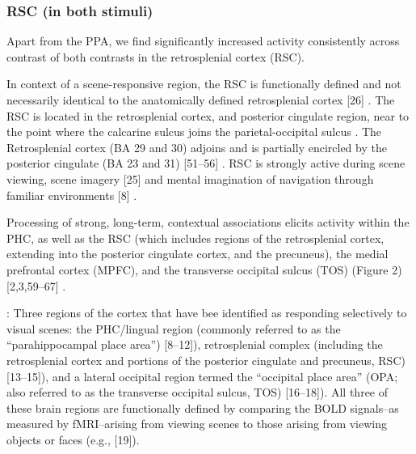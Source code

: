 \documentclass[english]{article}
\begin{document}
\subsubsection{RSC (in both stimuli)}



Apart from the PPA, we find significantly increased activity consistently across
contrast of both contrasts in the retrosplenial cortex (RSC).

In context of a scene-responsive region, the RSC is functionally defined and not
necessarily identical to the anatomically defined retrosplenial cortex [26]
\citep{epstein2008parahippocampal}.
The RSC is located in the retrosplenial cortex, and posterior cingulate region,
near to the point where the calcarine sulcus joins the parietal-occipital sulcus
\citep{epstein2008parahippocampal}.
The Retrosplenial cortex (BA 29 and 30) adjoins and is partially encircled by
the posterior cingulate (BA 23 and 31) [51–56]
\citep{epstein2008parahippocampal}.
RSC is strongly active during scene viewing, scene imagery [25] and mental
imagination of navigation through familiar environments [8]
\citep{epstein2008parahippocampal}.

Processing of strong, long-term, contextual associations elicits activity within
the PHC, as well as the RSC (which includes regions of the retrosplenial cortex,
extending into the posterior cingulate cortex, and the precuneus), the medial
prefrontal cortex (MPFC), and the transverse occipital sulcus (TOS) (Figure 2)
[2,3,59–67] \citep{aminoff2013role}.



\citep{aminoff2015associative}: Three regions of the cortex that have bee
identified as responding selectively to visual scenes: the PHC/lingual region
(commonly referred to as the “parahippocampal place area”) [8–12]),
retrosplenial complex (including the retrosplenial cortex and portions of the
posterior cingulate and precuneus, RSC) [13–15]), and a lateral occipital region
termed the “occipital place area” (OPA; also referred to as the transverse
occipital sulcus, TOS) [16–18]).
%
All three of these brain regions are functionally defined by comparing the BOLD
signals–as measured by fMRI–arising from viewing scenes to those arising from
viewing objects or faces (e.g., [19])\citep{aminoff2015associative}.
\end{document}
